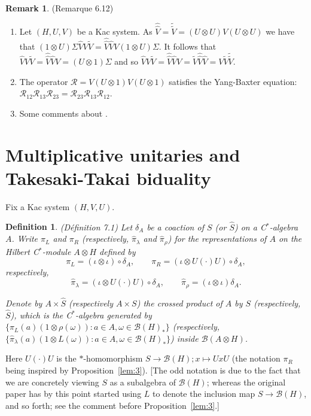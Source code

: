 \documentclass[a4paper,12pt]{article}
\theoremstyle{plain}
\newtheorem{definition}[proposition]{Definition}
\theoremstyle{definition}
\newtheorem{remark}[proposition]{Remark}
\newcommand{\mc}{\mathcal}
\begin{document}
\begin{remark}(Remarque 6.12)
\begin{enumerate}
\item Let $(H,U,V)$ be a Kac system.  As $\hat{\hat V} = \tilde{\tilde V}
= (U\otimes U)V(U\otimes U)$ we have that $(1\otimes U)\Sigma \hat V V \tilde V
= \hat{\hat V} \hat V V (1\otimes U)\Sigma$.  It follows that $\hat V V \tilde V
= \hat{\hat V} \hat V V = (U\otimes 1)\Sigma$ and so $\hat V V \tilde V
= \hat{\hat V} \hat V V = \tilde V \hat{\hat V} \hat V = V \tilde V
\tilde{\tilde V}$.
\item The operator $\mc R = V(U\otimes 1)V(U\otimes 1)$ satisfies the Yang-Baxter
equation: $\mc R_{12} \mc R_{13} \mc R_{23} = \mc R_{23} \mc R_{13} \mc R_{12}$.
\item Some comments about \cite{r11}.
\end{enumerate}
\end{remark}





\section{Multiplicative unitaries and Takesaki-Takai biduality}

Fix a Kac system $(H,V,U)$.

\begin{definition}(D\'efinition 7.1)
Let $\delta_A$ be a coaction of $S$ (or $\hat S$) on a C$^*$-algebra $A$.
Write $\pi_L$ and $\pi_R$ (respectively, $\hat\pi_\lambda$ and $\hat\pi_\rho$)
for the representations of $A$ on the Hilbert C$^*$-module $A\otimes H$
defined by
\[ \pi_L = (\iota\otimes\iota)\circ\delta_A, \qquad
\pi_R = (\iota\otimes U(\cdot)U)\circ\delta_A, \]
respectively,
\[ \hat\pi_\lambda = (\iota\otimes U(\cdot)U)\circ\delta_A, \qquad
\hat\pi_\rho = (\iota\otimes\iota)\delta_A. \]

Denote by $A\times\hat S$ (respectively $A\times S$) the \emph{crossed product}
of $A$ by $S$ (respectively, $\hat S$), which is the C$^*$-algebra generated
by $\{ \pi_L(a)(1\otimes \rho(\omega)) : a\in A, \omega\in\mc B(H)_*\}$
(respectively, $\{ \hat\pi_\lambda(a)(1\otimes L(\omega)) : a\in A,
\omega\in\mc B(H)_*\}$) inside $\mc B(A\otimes H)$.
\end{definition}

Here $U(\cdot)U$ is the $*$-homomorphism $S\rightarrow \mc B(H);
x\mapsto UxU$ (the notation $\pi_R$ being inspired by Proposition~\ref{lem:3}).
[The odd notation is due to the fact that we are concretely viewing
$S$ as a subalgebra of $\mc B(H)$; whereas the original paper has by this
point started using $L$ to denote the inclusion map $S\rightarrow
\mc B(H)$, and so forth; see the comment before Proposition~\ref{lem:3}.]
\end{document}
